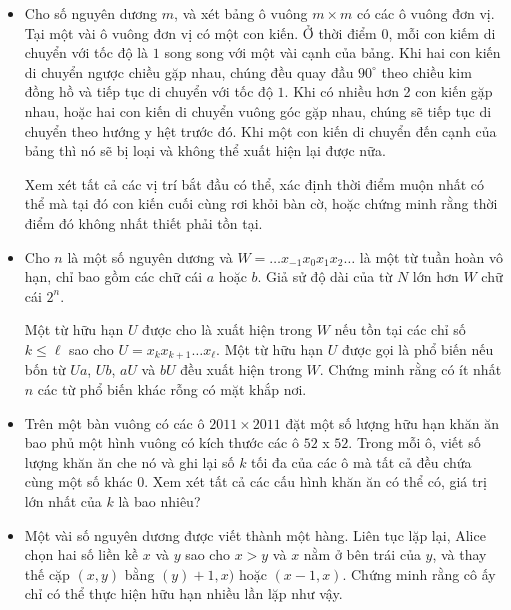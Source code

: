 \documentclass[11pt]{scrartcl}
\begin{document}
\begin{itemize}[label=, leftmargin=0em, itemsep=-0em]
    \item \begin{btvn}
        Cho số nguyên dương $m$, và xét bảng ô vuông $m\times m$ có các ô vuông đơn vị. Tại một vài ô vuông đơn vị có một con kiến. Ở thời điểm $0$, mỗi con kiếm di chuyển với tốc độ là $1$ song song với một vài cạnh của bảng. Khi hai con kiến di chuyển ngược chiều gặp nhau, chúng đều quay đầu $90^{\circ}$ theo chiều kim đồng hồ và tiếp tục di chuyển với tốc độ $1$. Khi có nhiều hơn 2 con kiến gặp nhau, hoặc hai con kiến di chuyển vuông góc gặp nhau, chúng sẽ tiếp tục di chuyển theo hướng y hệt trước đó. Khi một con kiến di chuyển đến cạnh của bảng thì nó sẽ bị loại và không thể xuất hiện lại được nữa. 

        Xem xét tất cả các vị trí bắt đầu có thể, xác định thời điểm muộn nhất có thể mà tại đó con kiến cuối cùng rơi khỏi bàn cờ, hoặc chứng minh rằng thời điểm đó không nhất thiết phải tồn tại.

    \end{btvn}

    \item \begin{btvn}
    Cho $n$ là một số nguyên dương và $W = \ldots x_{-1}x_0x_1x_2 \ldots$ là một từ tuần hoàn vô hạn, chỉ bao gồm các chữ cái $a$ hoặc $b$. Giả sử độ dài của từ $N$ lớn hơn $W$ chữ cái $2^n$.

    Một từ hữu hạn $U$ được cho là xuất hiện trong $W$ nếu tồn tại các chỉ số $k \leq \ell$ sao cho $U=x_k x_{k+1} \ldots x_{\ell}$. Một từ hữu hạn $U$ được gọi là phổ biến nếu bốn từ $Ua$, $Ub$, $aU$ và $bU$ đều xuất hiện trong $W$. Chứng minh rằng có ít nhất $n$ các từ phổ biến khác rỗng có mặt khắp nơi.
    \end{btvn}

    \item \begin{btvn}
    Trên một bàn vuông có các ô $2011 \times 2011$ đặt một số lượng hữu hạn khăn ăn bao phủ một hình vuông có kích thước các ô $52$ x $52$. Trong mỗi ô, viết số lượng khăn ăn che nó và ghi lại số $k$ tối đa của các ô mà tất cả đều chứa cùng một số khác 0. Xem xét tất cả các cấu hình khăn ăn có thể có, giá trị lớn nhất của $k$ là bao nhiêu?
    \end{btvn}
    \item \begin{btvn}
        Một vài số nguyên dương được viết thành một hàng. Liên tục lặp lại, Alice chọn hai số liền kề $x$ và $y$ sao cho $x>y$ và $x$ nằm ở bên trái của $y$, và thay thế cặp $(x,y)$ bằng $(y) +1,x)$ hoặc $(x-1,x)$. Chứng minh rằng cô ấy chỉ có thể thực hiện hữu hạn nhiều lần lặp như vậy.
    \end{btvn}


\end{itemize}
\end{document}
